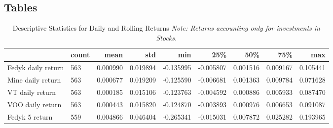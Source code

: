 \begin{appendices}
\section{Tables}


\begin{table}[ht]
\centering
\caption{Descriptive Statistics for Daily and Rolling Returns
\newline \footnotesize{\textit{Note: Returns accounting only for investments in Stocks.}}}
\begin{adjustbox}{width=\textwidth}
    \begin{tabular}{@{}l|llllllll@{}}
    \toprule
    \multicolumn{1}{r}{\textbf{}}       & \multicolumn{1}{r}{\textbf{count}} & \multicolumn{1}{r}{\textbf{mean}} & \multicolumn{1}{r}{\textbf{std}} & \multicolumn{1}{r}{\textbf{min}} & \multicolumn{1}{r}{\textbf{25\%}} & \multicolumn{1}{r}{\textbf{50\%}} & \multicolumn{1}{r}{\textbf{75\%}} & \multicolumn{1}{r}{\textbf{max}} \\ \midrule
    Fedyk daily return  & 563                                & 0.000990                          & 0.019894                         & -0.135995                        & -0.005807                         & 0.001516                          & 0.009167                          & 0.105441                         \\
    Mine daily return   & 563                                & 0.000677                          & 0.019209                         & -0.125590                        & -0.006681                         & 0.001363                          & 0.009784                          & 0.071628                         \\
    VT daily return             & 563                               & 0.000185                           & 0.015106                         & -0.123763                        & -0.004592                         & 0.000886                          & 0.005933                          & 0.087470                         \\
    VOO daily return            & 563                               & 0.000443                           & 0.015820                         & -0.124870                        & -0.003893                         & 0.000976                          & 0.006653                          & 0.091087                         \\
    Fedyk 5 return       & 559                                & 0.004866                          & 0.046404                         & -0.265341                        & -0.015031                         & 0.007872                          & 0.025282                          & 0.193965                         \\

\end{tabular}
\end{adjustbox}
\end{table}
\end{appendices}
